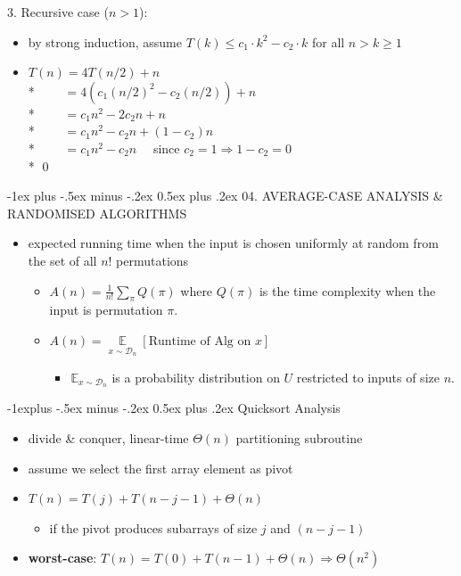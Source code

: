 \documentclass[10pt, landscape]{article}
\makeatletter
\renewcommand{\section}{\@startsection{section}{1}{0mm}%
  {-1ex plus -.5ex minus -.2ex}%
  {0.5ex plus .2ex}%
{\normalfont\large\bfseries}}
\renewcommand{\subsection}{\@startsection{subsection}{2}{0mm}%
  {-1explus -.5ex minus -.2ex}%
  {0.5ex plus .2ex}%
{\normalfont\normalsize\bfseries}}
\makeatother
\begin{document}
\begin{multicols*}{4}
\begin{niceproof}
    3. Recursive case ($n>1$):
    \begin{itemize}
      \item by strong induction, assume $T(k) \leq c_1 \cdot k^2 - c_2 \cdot k$ for all $n>k \geq 1$ 
      \item $T(n) = 4T(n/2) + n$ 
        \\* $\quad\quad = 4(c_1 (n/2)^2 - c_2 (n/2)) + n$
        \\* $\quad\quad = c_1n^2 - 2c_2n + n $
        \\* $\quad\quad = c_1n^2 - c_2n + (1-c_2) n$
        \\* $\quad\quad = c_1n^2 - c_2n \quad $ since $c_2=1 \Rightarrow 1-c_2 = 0$
        \\* \qed
    \end{itemize}
  \end{niceproof}

  \section{04. AVERAGE-CASE ANALYSIS \& RANDOMISED ALGORITHMS}

  \begin{itemize}
    \item {} expected running time when the input is chosen uniformly at random from the set of all $n!$ permutations
      \begin{itemize}
        \item $A(n) = \frac{1}{n!} \sum_\pi Q(\pi)$ where $Q(\pi)$ is the time complexity when the input is permutation $\pi$.
        \item $A(n) = \mathop{\mathbb{E}}\limits_{x \sim \mathcal{D}_n} [ \text{Runtime of Alg on }x ] $
          \begin{itemize}
            \item $ \mathbb{E}_{x \sim \mathcal{D}_n} $ is a probability distribution on $U$ restricted to inputs of size $n$.
          \end{itemize}
      \end{itemize}
  \end{itemize}

  \subsection{Quicksort Analysis}

  \begin{itemize}
    \item divide \& conquer, linear-time $\Theta(n)$ partitioning subroutine
    \item assume we select the first array element as pivot 
    \item $T(n) = T(j) + T(n-j-1) + \Theta(n)$
      \begin{itemize}
        \item if the pivot produces subarrays of size $j$ and $(n-j-1)$
      \end{itemize}
    \item \textbf{worst-case}: $T(n) = T(0) + T(n-1) + \Theta(n) \Rightarrow \Theta(n^2)$ 
  \end{itemize}


\end{multicols*}
\end{document}
